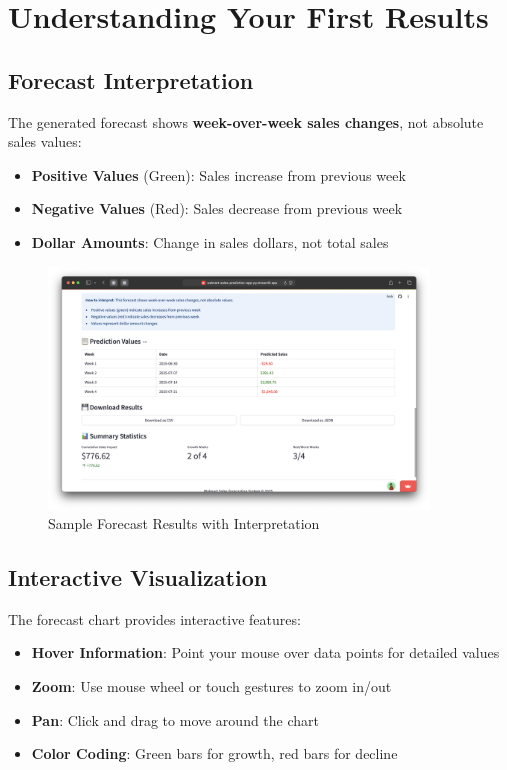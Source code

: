 \section{Understanding Your First Results}

\subsection{Forecast Interpretation}

The generated forecast shows \textbf{week-over-week sales changes}, not absolute sales values:

\begin{itemize}
	\item \textbf{Positive Values} (Green): Sales increase from previous week
	\item \textbf{Negative Values} (Red): Sales decrease from previous week
	\item \textbf{Dollar Amounts}: Change in sales dollars, not total sales
\end{itemize}

\begin{figure}[H]
	\centering
	\includegraphics[width=0.9\textwidth]{Images/03FirstStepsGuide/ForecastResults.png}
	\caption{Sample Forecast Results with Interpretation}
	\label{fig:forecast_results}
\end{figure}

\subsection{Interactive Visualization}

The forecast chart provides interactive features:

\begin{itemize}
	\item \textbf{Hover Information}: Point your mouse over data points for detailed values
	\item \textbf{Zoom}: Use mouse wheel or touch gestures to zoom in/out
	\item \textbf{Pan}: Click and drag to move around the chart
	\item \textbf{Color Coding}: Green bars for growth, red bars for decline
\end{itemize}

